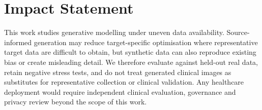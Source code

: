 \documentclass{article}
\begin{document}
\section*{Impact Statement}
This work studies generative modelling under uneven data availability. Source-informed generation may reduce target-specific optimisation where representative target data are difficult to obtain, but synthetic data can also reproduce existing bias or create misleading detail. We therefore evaluate against held-out real data, retain negative stress tests, and do not treat generated clinical images as substitutes for representative collection or clinical validation. Any healthcare deployment would require independent clinical evaluation, governance and privacy review beyond the scope of this work.

\clearpage
\appendix
\let\AppendixSection\section
\renewcommand{\section}{\FloatBarrier\AppendixSection}

\end{document}
